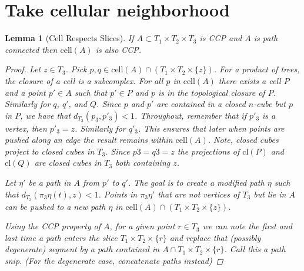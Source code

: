 \documentclass[12pt,parskip=full]{report}
\theoremstyle{plain}
\newtheorem{lem}[thm]{Lemma}
\theoremstyle{definition}
\begin{document}
        
        
        
        
        
        
        
        
        
    \section{Take cellular neighborhood}
        
\begin{lem}
    [Cell Respects Slices]
    \label{lem:cellrespecslice} 
    If $A\subset T_1\times T_2\times T_3$ is CCP and \(A\) is path connected then $\text{cell}(A)$ is also CCP.

    \begin{proof}
        Let \(z\in T_3\). Pick \(p,q\in \text{cell}(A)\cap (T_1\times T_2\times \{z\})\). For a product of trees, the closure of a cell is a subcomplex. For all \(p\) in \(\text{cell}(A)\) there exists a cell \(P\) and a point \(p'\in A\) such that \(p' \in P\) and \(p\) is in the topological closure of \(P\). Similarly for \(q\), \(q'\), and \(Q\). Since \(p\) and \(p'\) are contained in a closed \(n\)-cube but \(p\) in \(P\), we have that \(d_{T_3}(p_3,p'_3)<1\). Throughout, remember that if \(p'_3\) is a vertex, then \(p'_3 = z\). Similarly for \(q'_3\). This ensures that later when points are pushed along an edge the result remains within \(\text{cell}(A)\).  Note, closed cubes project to closed cubes in \(T_3\). Since \(p3=q3=z\) the projections of \(\text{cl}(P)\) and \(\text{cl}(Q)\) are closed cubes in \(T_3\) both containing \(z\).
        
        Let $\eta'$ be a path in \(A\) from \(p'\) to \(q'\). The goal is to create a modified path \(\eta\) such that \(d_{T_3}(\pi_3\eta(t), z) <1\). Points in \(\pi_3\eta'\) that are not vertices of \(T_3\) but lie in \(A\) can be pushed to a new path \(\eta\) in \(\text{cell}(A)\cap(T_1\times T_2\times \{z\})\). 
        
        Using the CCP property of \(A\), for a given point \(r\in T_3\) we can note the first and last time a path enters the slice \(T_1\times T_2\times \{r\}\) and replace that (possibly degenerate) segment by a path contained in \(A\cap T_1\times T_2\times \{r\}\). Call this a path snip. (For the degenerate case, concatenate paths instead)
        

\end{proof}
\end{lem}
\end{document}
